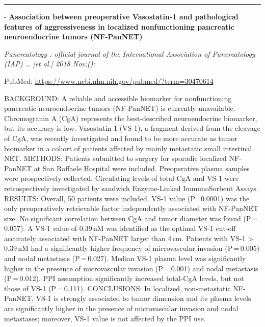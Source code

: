 \documentclass[]{article}
\begin{document}
{}

{}

\begin{center}\rule{0.5\linewidth}{\linethickness}\end{center}

 - \textbf{Association between preoperative Vasostatin-1 and
pathological features of aggressiveness in localized nonfunctioning
pancreatic neuroendocrine tumors (NF-PanNET)}

\emph{Pancreatology : official journal of the International Association
of Pancreatology (IAP) \ldots{} {[}et al.{]} 2018 Nov;():}

PubMed: \url{https://www.ncbi.nlm.nih.gov/pubmed/?term=30470614}

BACKGROUND: A reliable and accessible biomarker for nonfunctioning
pancreatic neuroendocrine tumors (NF-PanNET) is currently unavailable.
Chromogranin A (CgA) represents the best-described neuroendocrine
biomarker, but its accuracy is low. Vasostatin-1 (VS-1), a fragment
derived from the cleavage of CgA, was recently investigated and found to
be more accurate as tumor biomarker in a cohort of patients affected by
mainly metastatic small intestinal NET. METHODS: Patients submitted to
surgery for sporadic localized NF-PanNET at San Raffaele Hospital were
included. Preoperative plasma samples were prospectively collected.
Circulating levels of total-CgA and VS-1 were retrospectively
investigated by sandwich Enzyme-Linked ImmunoSorbent Assays. RESULTS:
Overall, 50 patients were included. VS-1 value (P=0.0001) was the only
preoperatively retrievable factor independently associated with
NF-PanNET size. No significant correlation between CgA and tumor
diameter was found (P\,=\,0.057). A VS-1 value of 0.39\,nM was
identified as the optimal VS-1 cut-off accurately associated with
NF-PanNET larger than 4\,cm. Patients with VS-1 \textgreater{} 0.39\,nM
had a significantly higher frequency of microvascular invasion
(P\,=\,0.005) and nodal metastasis (P\,=\,0.027). Median VS-1 plasma
level was significantly higher in the presence of microvascular invasion
(P\,=\,0.001) and nodal metastasis (P\,=\,0.012). PPI assumption
significantly increased total-CgA levels, but not those of VS-1
(P\,=\,0.111). CONCLUSIONS: In localized, non-metastatic NF-PanNET, VS-1
is strongly associated to tumor dimension and its plasma levels are
significantly higher in the presence of microvascular invasion and nodal
metastases; moreover, VS-1 value is not affected by the PPI use.

{}
\end{document}
